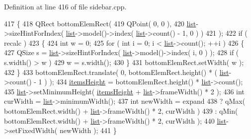 Definition at line 416 of file sidebar.\+cpp.


\begin{DoxyCode}
417 \{
418     QRect bottomElemRect(
419         QPoint( 0, 0 ),
420         \hyperlink{classSidebar_1_1Private_a0b3cabc80bb0d0d9259723cbe786908e}{list}->sizeHintForIndex( \hyperlink{classSidebar_1_1Private_a0b3cabc80bb0d0d9259723cbe786908e}{list}->model()->index( \hyperlink{classSidebar_1_1Private_a0b3cabc80bb0d0d9259723cbe786908e}{list}->count() - 1, 0 ) )
421     );
422     \textcolor{keywordflow}{if} ( recalc )
423     \{
424         \textcolor{keywordtype}{int} w = 0;
425         \textcolor{keywordflow}{for} ( \textcolor{keywordtype}{int} i = 0; i < \hyperlink{classSidebar_1_1Private_a0b3cabc80bb0d0d9259723cbe786908e}{list}->count(); ++i )
426         \{
427             QSize s = \hyperlink{classSidebar_1_1Private_a0b3cabc80bb0d0d9259723cbe786908e}{list}->sizeHintForIndex( \hyperlink{classSidebar_1_1Private_a0b3cabc80bb0d0d9259723cbe786908e}{list}->model()->index( i, 0 ) );
428             \textcolor{keywordflow}{if} ( s.width() > w )
429                 w = s.width();
430         \}
431         bottomElemRect.setWidth( w );
432     \}
433     bottomElemRect.translate( 0, bottomElemRect.height() * ( \hyperlink{classSidebar_1_1Private_a0b3cabc80bb0d0d9259723cbe786908e}{list}->count() - 1 ) );
434     \hyperlink{classSidebar_1_1Private_a467a6317bcfa987166b354f2145e1dbb}{itemsHeight} = bottomElemRect.height() * \hyperlink{classSidebar_1_1Private_a0b3cabc80bb0d0d9259723cbe786908e}{list}->count();
435     \hyperlink{classSidebar_1_1Private_a0b3cabc80bb0d0d9259723cbe786908e}{list}->setMinimumHeight( \hyperlink{classSidebar_1_1Private_a467a6317bcfa987166b354f2145e1dbb}{itemsHeight} + \hyperlink{classSidebar_1_1Private_a0b3cabc80bb0d0d9259723cbe786908e}{list}->frameWidth() * 2 );
436     \textcolor{keywordtype}{int} curWidth = \hyperlink{classSidebar_1_1Private_a0b3cabc80bb0d0d9259723cbe786908e}{list}->minimumWidth();
437     \textcolor{keywordtype}{int} newWidth = expand
438                    ? qMax( bottomElemRect.width() + \hyperlink{classSidebar_1_1Private_a0b3cabc80bb0d0d9259723cbe786908e}{list}->frameWidth() * 2, curWidth )
439                    : qMin( bottomElemRect.width() + \hyperlink{classSidebar_1_1Private_a0b3cabc80bb0d0d9259723cbe786908e}{list}->frameWidth() * 2, curWidth );
440     \hyperlink{classSidebar_1_1Private_a0b3cabc80bb0d0d9259723cbe786908e}{list}->setFixedWidth( newWidth );
441 \}
\end{DoxyCode}


